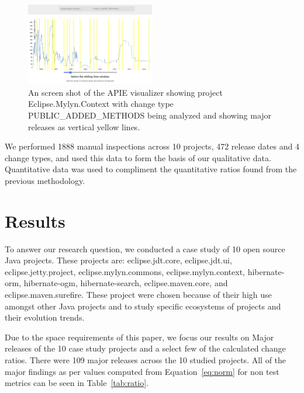 \documentclass[conference]{IEEEtran}
\begin{document}
\begin{figure}[tb!]
\centering
\includegraphics[width=0.5\textwidth]{images/apie.png}
\caption{An screen shot of the APIE visualizer showing project Eclipse.Mylyn.Context with change type PUBLIC\_ADDED\_METHODS being analyzed and showing
major releases as vertical yellow lines.\label{fig:apie}}
\end{figure}

We performed 1888 manual inspections across 10 projects, 472 release dates and 4 change types, and used this data to form the basis of our qualitative data.
Quantitative data was used to compliment the quantitative ratios found from the previous methodology. 

\section{Results}
\label{sec:results}

To answer our research question, we conducted a case study of 10 open source Java projects. These projects are: eclipse.jdt.core, eclipse.jdt.ui, eclipse.jetty.project, 
eclipse.mylyn.commons, eclipse.mylyn.context, hibernate-orm, hibernate-ogm, hibernate-search, eclipse.maven.core, and eclipse.maven.surefire. These project were chosen
because of their high use amongst other Java projects and to study specific ecosystems of projects and their evolution trends.

Due to the space requirements of this paper, we focus our results on Major releases of the 10 case study projects and a select few of the calculated change ratios. 
There were 109 major releases across the 10 studied projects. All of the major findings as per values computed from Equation~\ref{eq:norm} for non test metrics
can be seen in Table~\ref{tab:ratio}.
\end{document}
